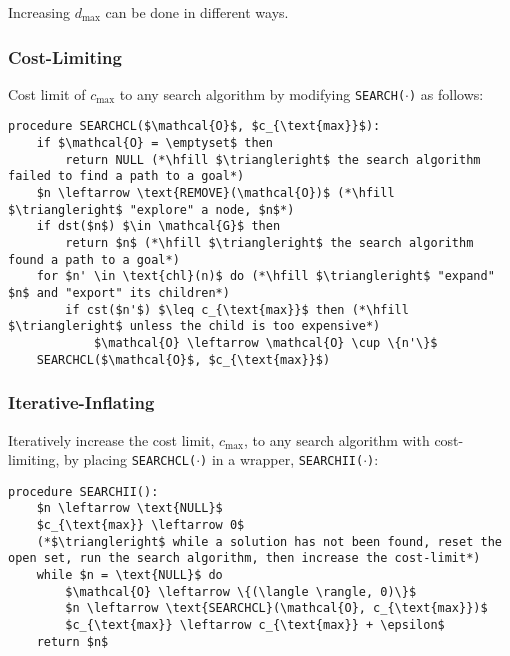 \begin{warning}
    Increasing $d_{\text{max}}$ can be done in different ways.
\end{warning}

\subsubsection{Cost-Limiting}
\begin{definition}
    Cost limit of $c_{\text{max}}$ to any search algorithm by modifying \texttt{SEARCH($\cdot$)} as follows:

\begin{lstlisting}
procedure SEARCHCL($\mathcal{O}$, $c_{\text{max}}$):
    if $\mathcal{O} = \emptyset$ then
        return NULL (*\hfill $\triangleright$ the search algorithm failed to find a path to a goal*)
    $n \leftarrow \text{REMOVE}(\mathcal{O})$ (*\hfill $\triangleright$ "explore" a node, $n$*)
    if dst($n$) $\in \mathcal{G}$ then
        return $n$ (*\hfill $\triangleright$ the search algorithm found a path to a goal*)
    for $n' \in \text{chl}(n)$ do (*\hfill $\triangleright$ "expand" $n$ and "export" its children*)
        if cst($n'$) $\leq c_{\text{max}}$ then (*\hfill $\triangleright$ unless the child is too expensive*)
            $\mathcal{O} \leftarrow \mathcal{O} \cup \{n'\}$
    SEARCHCL($\mathcal{O}$, $c_{\text{max}}$)
\end{lstlisting}

\end{definition}

\subsubsection{Iterative-Inflating}
\begin{definition}
    Iteratively increase the cost limit, $c_{\text{max}}$, to any search algorithm with cost-limiting, by placing \texttt{SEARCHCL($\cdot$)} in a wrapper, \texttt{SEARCHII($\cdot$)}:

\begin{lstlisting}
procedure SEARCHII():
    $n \leftarrow \text{NULL}$
    $c_{\text{max}} \leftarrow 0$
    (*$\triangleright$ while a solution has not been found, reset the open set, run the search algorithm, then increase the cost-limit*)
    while $n = \text{NULL}$ do
        $\mathcal{O} \leftarrow \{(\langle \rangle, 0)\}$
        $n \leftarrow \text{SEARCHCL}(\mathcal{O}, c_{\text{max}})$
        $c_{\text{max}} \leftarrow c_{\text{max}} + \epsilon$
    return $n$
\end{lstlisting}

\end{definition}

